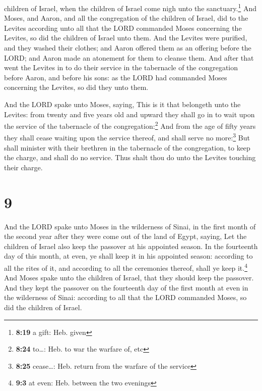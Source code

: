 children of Israel, when the children of Israel come nigh unto the
sanctuary.\footnote{\textbf{8:19} a gift: Heb. given} 
And Moses, and Aaron, and all the congregation of the children of
Israel, did to the Levites according unto all that the LORD commanded
Moses concerning the Levites, so did the children of Israel unto them.
 And the Levites were purified, and they washed their
clothes; and Aaron offered them as an offering before the LORD; and
Aaron made an atonement for them to cleanse them.  And
after that went the Levites in to do their service in the tabernacle of
the congregation before Aaron, and before his sons: as the LORD had
commanded Moses concerning the Levites, so did they unto them.

 And the LORD spake unto Moses, saying, 
This is it that belongeth unto the Levites: from twenty and five years
old and upward they shall go in to wait upon the service of the
tabernacle of the congregation:\footnote{\textbf{8:24} to\ldots: Heb. to
  war the warfare of, etc}  And from the age of fifty
years they shall cease waiting upon the service thereof, and shall serve
no more:\footnote{\textbf{8:25} cease\ldots: Heb. return from the
  warfare of the service}  But shall minister with their
brethren in the tabernacle of the congregation, to keep the charge, and
shall do no service. Thus shalt thou do unto the Levites touching their
charge.

\hypertarget{section-8}{%
\section{9}\label{section-8}}

 And the LORD spake unto Moses in the wilderness of Sinai,
in the first month of the second year after they were come out of the
land of Egypt, saying,  Let the children of Israel also
keep the passover at his appointed season.  In the
fourteenth day of this month, at even, ye shall keep it in his appointed
season: according to all the rites of it, and according to all the
ceremonies thereof, shall ye keep it.\footnote{\textbf{9:3} at even:
  Heb. between the two evenings}  And Moses spake unto the
children of Israel, that they should keep the passover. 
And they kept the passover on the fourteenth day of the first month at
even in the wilderness of Sinai: according to all that the LORD
commanded Moses, so did the children of Israel.


